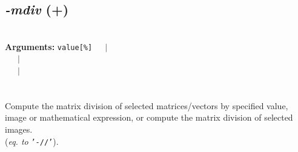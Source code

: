 \documentclass[a4paper,11pt,twoside]{book}
\begin{document}
\subsection{\emph{-mdiv} (+)}\vspace*{-0.5em}
~\\\textbf{Arguments: } 
{\small \texttt{value[\%]}}~~~$|$\\
\hspace*{2.2cm}{\small \texttt{[image]}}~~~$|$\\
~~~$|$\\
\\~\\
Compute the matrix division of selected matrices/vectors by specified value, image or
mathematical expression, or compute the matrix division of selected images.
~\\(\emph{eq. to} {\small \texttt{'-//'}}).
\end{document}
